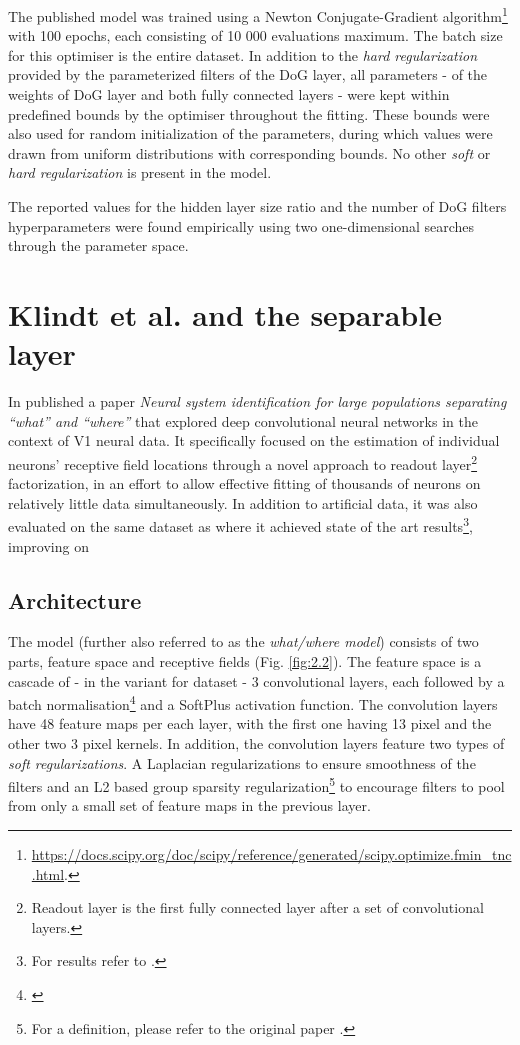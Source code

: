 The published model was trained using a Newton Conjugate-Gradient algorithm\footnote{\href{https://docs.scipy.org/doc/scipy/reference/generated/scipy.optimize.fmin_tnc.html}{https://docs.scipy.org/doc/scipy/reference/generated/scipy.optimize.fmin\_tnc.html}.} with 100 epochs, each consisting of 10 000 evaluations maximum. The batch size for this optimiser is the entire dataset. In addition to the \textit{hard regularization} provided by the parameterized filters of the DoG layer, all parameters - of the weights of DoG layer and both fully connected layers - were kept within predefined bounds by the optimiser throughout the fitting. These bounds were also used for random initialization of the parameters, during which values were drawn from uniform distributions with corresponding bounds. No other \textit{soft} or \textit{hard regularization} is present in the model. 

The reported values for the hidden layer size ratio and the number of DoG filters hyperparameters were found empirically using two one-dimensional searches through the parameter space.

\section{Klindt et al. and the separable layer}\label{ch:2.2}

In \citeyear{klindt} \citeauthor{klindt} published a paper \textit{Neural system identification for large populations separating “what” and “where”} that explored deep convolutional neural networks in the context of V1 neural data. It specifically focused on the estimation of individual neurons’ receptive field locations through a novel approach to readout layer\footnote{Readout layer is the first fully connected layer after a set of convolutional layers.} factorization, in an effort to allow effective fitting of thousands of neurons on relatively little data simultaneously. In addition to artificial data, it was also evaluated on the same dataset as \cite{antolik} where it achieved state of the art results\footnote{For results refer to .}, improving on \cite{antolik}

\subsection{Architecture}

The model (further also referred to as the \textit{what/where model}) consists of two parts, feature space and receptive fields (Fig. \ref{fig:2.2}). The feature space is a cascade of - in the variant for \citeauthor{antolik} dataset - 3 convolutional layers, each followed by a batch normalisation\footnote{\citep{2015arXiv150203167I}} and a SoftPlus activation function. The convolution layers have 48 feature maps per each layer, with the first one having 13 pixel and the other two 3 pixel kernels. In addition, the convolution layers feature two types of \textit{soft regularizations}. A Laplacian regularizations to ensure smoothness of the filters and an L2 based group sparsity regularization\footnote{For a definition, please refer to the original paper \citep{klindt}.} to encourage filters to pool from only a small set of feature maps in the previous layer.

